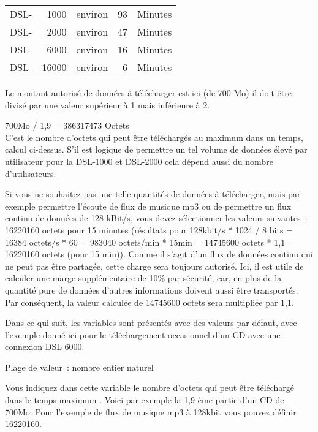\begin{description}
   \begin{tabular}{lrlrl}

    DSL-&1000 & environ & 93 & Minutes \\
    DSL-&2000 & environ & 47 & Minutes \\
    DSL-&6000 & environ & 16 & Minutes \\
    DSL-&16000 & environ & 6 & Minutes \\

   \end{tabular}

   Le montant autorisé de données à télécharger est ici (de 700 Mo) il doit être divisé par une valeur
   supérieur à 1 mais inférieure à 2.

 700Mo / 1,9 = 386317473 Octets \\
   C'est le nombre d'octets qui peut être téléchargés au maximum dans un temps, calcul ci-dessus.
   S'il est logique de permettre un tel volume de données élevé par utilisateur pour la DSL-1000
   et DSL-2000 cela dépend aussi du nombre d'utilisateurs.

   Si vous ne souhaitez pas une telle quantités de données à télécharger, mais par exemple permettre
   l'écoute de flux de musique mp3 ou de permettre un flux continu de données de 128 kBit/s, vous
   devez sélectionner les valeurs suivantes~: 16220160 octets pour 15 minutes
   (résultats pour 128kbit/s * 1024 / 8 bits = 16384 octets/s * 60 = 983040 octets/min * 15min = 14745600 octets * 1,1 = 16220160 octets (pour 15 min)).
   Comme il s'agit d'un flux de données continu qui ne peut pas être partagée, cette charge sera toujours
   autorisé. Ici, il est utile de calculer une marge supplémentaire de 10\% par sécurité, car, en plus
   de la quantité pure de données d'autres informations doivent aussi être transportés. Par conséquent,
   la valeur calculée de 14745600 octets sera multipliée par 1,1.

   Dans ce qui suit, les variables sont présentés avec des valeurs par défaut, avec l'exemple donné ici pour
   le téléchargement occasionnel d'un CD avec une connexion DSL 6000.



   Plage de valeur~: nombre entier naturel

   Vous indiquez dans cette variable le nombre d'octets qui peut être téléchargé dans le temps maximum
   . Voici par exemple la 1,9 ème
   partie d'un CD de 700Mo. Pour l'exemple de flux de musique mp3 à 128kbit vous pouvez définir 16220160.


\end{description}
